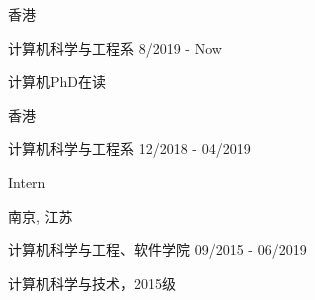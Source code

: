 \vspace{-4.0mm}

\begin{cventries}
\vspace{-1.5mm}

\cveducation
{}
{香港}

\cvsubeducation
{计算机科学与工程系}
{8/2019 - Now}
{
    \begin{cvitems}
    \item {计算机PhD在读}
    \end{cvitems}
}

\cveducation
{}
{香港}

\cvsubeducation
{计算机科学与工程系}
{12/2018 - 04/2019}
{
    \begin{cvitems}
    \item {Intern}
    \end{cvitems}
}

\cveducation
{}
{南京, 江苏}

\cvsubeducation
{计算机科学与工程、软件学院}
{09/2015 - 06/2019}
{
    \begin{cvitems}
    \item {计算机科学与技术，2015级}
    \end{cvitems}
}

\end{cventries}